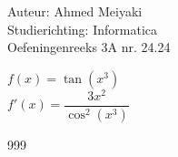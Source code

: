 \documentclass[a4paper]{article}
\begin{document}
  
\noindent \large Auteur: Ahmed Meiyaki \\
\noindent \large Studierichting: Informatica\\
\noindent \large Oefeningenreeks 3A nr. 24.24\\

\medskip

\normalsize

$f(x) = \tan\left(x^3\right) $\\

$f'(x) = \dfrac{3x^2}{\cos^2\left(x^3\right)} $\\













\begin{thebibliography}{999}
\end{thebibliography}
\end{document}
